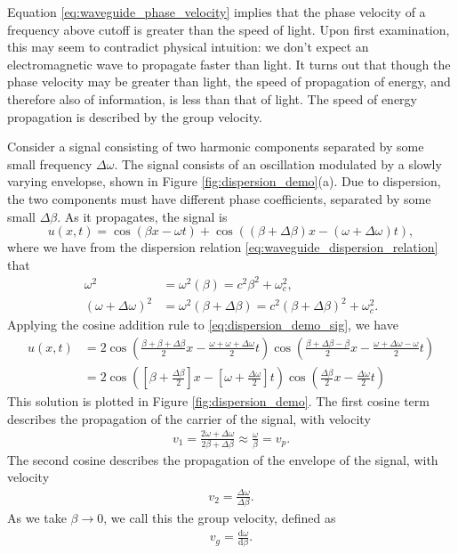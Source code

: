 \documentclass{article}
\newcommand{\dif}{\mathrm{d}}
\begin{document}
Equation \eqref{eq:waveguide_phase_velocity} implies that the phase velocity of a frequency above cutoff is greater than the speed of light. Upon first examination, this may seem to contradict physical intuition: we don't expect an electromagnetic wave to propagate faster than light. It turns out that though the phase velocity may be greater than light, the speed of propagation of energy, and therefore also of information, is less than that of light. The speed of energy propagation is described by the group velocity.

Consider a signal consisting of two harmonic components separated by some small frequency \(\Delta \omega\). The signal consists of an oscillation modulated by a slowly varying envelopse, shown in Figure \ref{fig:dispersion_demo}(a). Due to dispersion, the two components must have different phase coefficients, separated by some small \(\Delta \beta \). As it propagates, the signal is \begin{equation}\label{eq:dispersion_demo_sig}
    u(x, t) = \cos(\beta x - \omega t) + \cos((\beta + \Delta \beta ) x - (\omega + \Delta \omega )t),
\end{equation} where we have from the dispersion relation \eqref{eq:waveguide_dispersion_relation} that \begin{align*}
    \omega^2 &= \omega^2(\beta) = c^2\beta ^2 + \omega _c^2, \\
    (\omega + \Delta \omega )^2 &= \omega^2(\beta + \Delta \beta ) = c^2(\beta + \Delta \beta )^2 + \omega_c^2.
\end{align*} 
Applying the cosine addition rule to \eqref{eq:dispersion_demo_sig}, we have \begin{align*}
    u(x, t) &= 2\cos \left( \frac{\beta  + \beta  + \Delta \beta }{2}x - \frac{\omega + \omega + \Delta \omega }{2}t \right)\cos \left( \frac{\beta  + \Delta \beta - \beta }{2}x - \frac{\omega + \Delta \omega  - \omega}{2}t  \right) \\
    &= 2\cos \left( \left[\beta + \frac{\Delta \beta }{2}\right]x - \left[\omega  + \frac{\Delta \omega }{2}\right]t \right)\cos \left( \frac{\Delta \beta}{2}x - \frac{\Delta \omega}{2}t  \right)
\end{align*} This solution is plotted in Figure \ref{fig:dispersion_demo}. The first cosine term describes the propagation of the carrier of the signal, with velocity \begin{align*}
    v_1 = \frac{2\omega + \Delta \omega }{2\beta + \Delta \beta } \approx \frac{\omega}{\beta } = v_p.
\end{align*} The second cosine describes the propagation of the envelope of the signal, with velocity \begin{align*}
    v_2 = \frac{\Delta \omega }{\Delta \beta }.
\end{align*} As we take \(\beta \to 0\), we call this the group velocity, defined as \begin{align*}
    v_g = \frac{\dif \omega }{\dif \beta }.
\end{align*}
\end{document}
